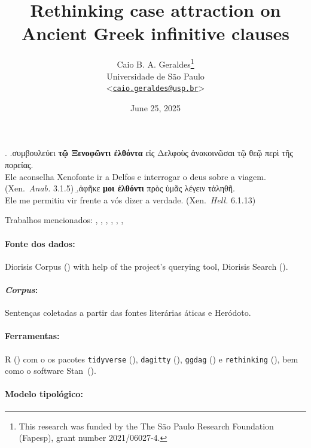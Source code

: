 \documentclass[a4paper, 12pt, article]{memoir}
\title{Rethinking case attraction on Ancient Greek infinitive clauses}
\author{
  Caio B. A. Geraldes\thanks{
		This research was funded by the 
	 The São Paulo Research Foundation (Fapesp), grant number 2021/06027-4.}
	\\\smallskip
	Universidade de São Paulo
	\\\smallskip
	<\href{mailto:caio.geraldes@usp.br}{\texttt{caio.geraldes@usp.br}}>
}
\date{June 25, 2025}
\begin{document}
\maketitle

\ex.
\a.συμβουλεύει \textbf{τῷ Ξενοφῶντι ἐλθόντα} {εἰς Δελφοὺς}
ἀνακοινῶσαι {τῷ θεῷ} {περὶ τῆς πορείας}.\\
Ele aconselha Xenofonte ir a Delfos e interrogar o deus sobre a viagem.
(Xen.\ \emph{Anab.} 3.1.5)
\b.ἀφῆκε \textbf{μοι ἐλθόντι} {πρὸς ὑμᾶς} λέγειν τἀληθῆ.\\
Ele me permitiu vir frente a vós dizer a verdade.
(Xen.\ \emph{Hell.} 6.1.13)


\noindent Trabalhos mencionados:
\textcite{Lancelot1658,Lancelot1709},
\textcite{Lakoff1970}, \textcite{Andrews1971}, \textcite{Quicoli1982},
\textcite{Spyropoulos2005}, \textcite{Tantalou2003},
\textcite{Sevdali2006,Sevdali2013}

\paragraph{Fonte dos dados:}  Diorisis Corpus
(\cite{TheDiorisisAncientGreekCorpus,diorisis2021}) with help of the project's
querying tool, Diorisis Search (\cite{DiorisisSearch}).

\paragraph{\emph{Corpus}:} Sentenças coletadas a partir das fontes literárias áticas e
Heródoto.

\paragraph{Ferramentas:} R (\cite{R}) com o os pacotes
\texttt{tidyverse} (\cite{tidyverse}), \texttt{dagitty} (\cite{dagitty}),
\texttt{ggdag} (\cite{ggdag}) e \texttt{rethinking} (\cite{McElreath2020}),
bem como o software Stan~(\cite{StanReferenceManual,StanUserGuide}).

\paragraph{Modelo tipológico:} \textcite{Corbett2006}
\end{document}
